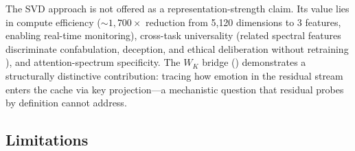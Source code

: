 \documentclass[11pt,a4paper]{article}
\begin{document}
The SVD approach is not offered as a representation-strength claim. Its value lies in compute efficiency (${\sim}1{,}700\times$ reduction from 5{,}120 dimensions to 3 features, enabling real-time monitoring), cross-task universality (related spectral features discriminate confabulation, deception, and ethical deliberation without retraining \citep{lyra2026oracle}), and attention-spectrum specificity. The $W_K$ bridge () demonstrates a structurally distinctive contribution: tracing how emotion in the residual stream enters the cache via key projection---a mechanistic question that residual probes by definition cannot address.

\subsection{Limitations}
\end{document}
